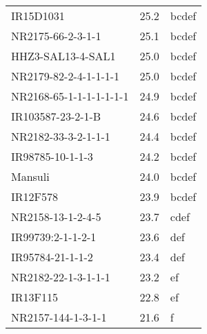 \documentclass[]{article}
\begin{document}
\begin{longtable}{lll}
IR15D1031 & 25.2 & bcdef\\
\rowcolor{gray!6}  NR2175-66-2-3-1-1 & 25.1 & bcdef\\
HHZ3-SAL13-4-SAL1 & 25.0 & bcdef\\
\addlinespace
\rowcolor{gray!6}  NR2179-82-2-4-1-1-1-1 & 25.0 & bcdef\\
NR2168-65-1-1-1-1-1-1-1 & 24.9 & bcdef\\
\rowcolor{gray!6}  IR103587-23-2-1-B & 24.6 & bcdef\\
NR2182-33-3-2-1-1-1 & 24.4 & bcdef\\
\rowcolor{gray!6}  IR98785-10-1-1-3 & 24.2 & bcdef\\
\addlinespace
Mansuli & 24.0 & bcdef\\
\rowcolor{gray!6}  IR12F578 & 23.9 & bcdef\\
NR2158-13-1-2-4-5 & 23.7 & cdef\\
\rowcolor{gray!6}  IR99739:2-1-1-2-1 & 23.6 & def\\
IR95784-21-1-1-2 & 23.4 & def\\
\addlinespace
\rowcolor{gray!6}  NR2182-22-1-3-1-1-1 & 23.2 & ef\\
IR13F115 & 22.8 & ef\\
\rowcolor{gray!6}  NR2157-144-1-3-1-1 & 21.6 & f\\
\bottomrule
\end{longtable}
\endgroup{}
\begingroup\fontsize{12}{14}\selectfont
\end{document}
